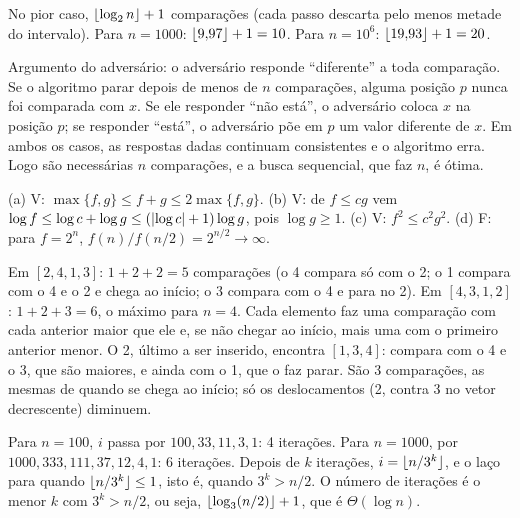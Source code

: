  No pior caso, $\lfloor\log_2n\rfloor+1$ comparações (cada passo descarta pelo menos metade do intervalo). Para $n=1000$: $\lfloor9{,}97\rfloor+1=10$. Para $n=10^6$: $\lfloor19{,}93\rfloor+1=20$.

 Argumento do adversário: o adversário responde ``diferente'' a toda comparação. Se o algoritmo parar depois de menos de $n$ comparações, alguma posição $p$ nunca foi comparada com $x$. Se ele responder ``não está'', o adversário coloca $x$ na posição $p$; se responder ``está'', o adversário põe em $p$ um valor diferente de $x$. Em ambos os casos, as respostas dadas continuam consistentes e o algoritmo erra. Logo são necessárias $n$ comparações, e a busca sequencial, que faz $n$, é ótima.

 (a) V: $\max\{f,g\}\le f+g\le2\max\{f,g\}$. (b) V: de $f\le cg$ vem $\log f\le\log c+\log g\le(\lvert\log c\rvert+1)\log g$, pois $\log g\ge1$. (c) V: $f^2\le c^2g^2$. (d) F: para $f=2^n$, $f(n)/f(n/2)=2^{n/2}\to\infty$.

 Em $[2,4,1,3]$: $1+2+2=5$ comparações (o 4 compara só com o 2; o 1 compara com o 4 e o 2 e chega ao início; o 3 compara com o 4 e para no 2). Em $[4,3,1,2]$: $1+2+3=6$, o máximo para $n=4$. Cada elemento faz uma comparação com cada anterior maior que ele e, se não chegar ao início, mais uma com o primeiro anterior menor. O 2, último a ser inserido, encontra $[1,3,4]$: compara com o 4 e o 3, que são maiores, e ainda com o 1, que o faz parar. São 3 comparações, as mesmas de quando se chega ao início; só os deslocamentos (2, contra 3 no vetor decrescente) diminuem.

 Para $n=100$, $i$ passa por $100,33,11,3,1$: 4 iterações. Para $n=1000$, por $1000,333,111,37,12,4,1$: 6 iterações. Depois de $k$ iterações, $i=\lfloor n/3^k\rfloor$, e o laço para quando $\lfloor n/3^k\rfloor\le1$, isto é, quando $3^k>n/2$. O número de iterações é o menor $k$ com $3^k>n/2$, ou seja, $\lfloor\log_3(n/2)\rfloor+1$, que é $\Theta(\log n)$.
